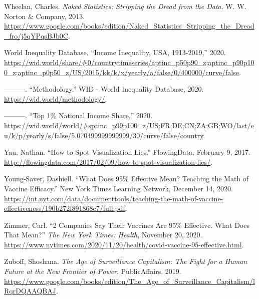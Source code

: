 \documentclass[
  english,
]{book}
\newlength{\cslhangindent}
\newlength{\cslentryspacingunit} %
\newenvironment{CSLReferences}[2] %
 {%
  \setlength{\parindent}{0pt}
  \ifodd #1
  \let\oldpar\par
  \def\par{\hangindent=\cslhangindent\oldpar}
  \fi
  \setlength{\parskip}{#2\cslentryspacingunit}
 }%
 {}
\begin{document}
\begin{CSLReferences}{1}{0}
\leavevmode{}%
Wheelan, Charles. \emph{Naked {Statistics}: {Stripping} the {Dread} from the {Data}}. {W. W. Norton \& Company}, 2013. \url{https://www.google.com/books/edition/Naked_Statistics_Stripping_the_Dread_fro/j5qYPqsBJb0C}.

\leavevmode{}%
World Inequality Database. {``Income {Inequality}, {USA}, 1913-2019,''} 2020. \url{https://wid.world/share/\#0/countrytimeseries/aptinc_p50p90_z;aptinc_p90p100_z;aptinc_p0p50_z/US/2015/kk/k/x/yearly/a/false/0/400000/curve/false}.

\leavevmode{}%
---------. {``Methodology.''} {WID - World Inequality Database}, 2020. \url{https://wid.world/methodology/}.

\leavevmode{}%
---------. {``Top 1\% {National Income Share},''} 2020. \url{https://wid.world/world/\#sptinc_p99p100_z/US;FR;DE;CN;ZA;GB;WO/last/eu/k/p/yearly/s/false/5.070499999999999/30/curve/false/country}.

\leavevmode{}%
Yau, Nathan. {``How to {Spot Visualization Lies}.''} {FlowingData}, February 9, 2017. \url{http://flowingdata.com/2017/02/09/how-to-spot-visualization-lies/}.

\leavevmode{}%
Young-Saver, Dashiell. {``What {Does} 95\% {Effective Mean}? {Teaching} the {Math} of {Vaccine Efficacy}.''} {New York Times Learning Network}, December 14, 2020. \url{https://int.nyt.com/data/documenttools/teaching-the-math-of-vaccine-effectiveness/190b272f891868c7/full.pdf}.

\leavevmode{}%
Zimmer, Carl. {``2 {Companies Say Their Vaccines Are} 95\% {Effective}. {What Does That Mean}?''} \emph{The New York Times: Health}, November 20, 2020. \url{https://www.nytimes.com/2020/11/20/health/covid-vaccine-95-effective.html}.

\leavevmode{}%
Zuboff, Shoshana. \emph{The {Age} of {Surveillance Capitalism}: {The Fight} for a {Human Future} at the {New Frontier} of {Power}}. {PublicAffairs}, 2019. \url{https://www.google.com/books/edition/The_Age_of_Surveillance_Capitalism/lRqrDQAAQBAJ}.

\end{CSLReferences}
\end{document}
